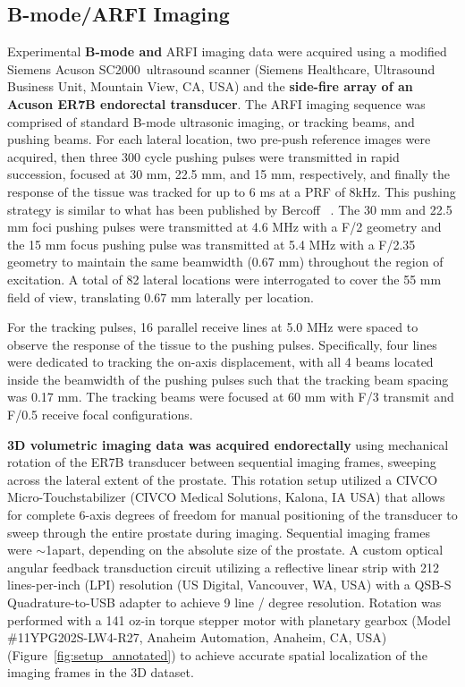 \subsection{B-mode/ARFI Imaging}
Experimental \textbf{B-mode and} ARFI imaging data were acquired using a modified Siemens Acuson
SC2000\texttrademark~ultrasound scanner (Siemens Healthcare, Ultrasound Business Unit,
Mountain View, CA, USA) and the \textbf{side-fire array of an Acuson ER7B
endorectal transducer}.  The ARFI imaging sequence was comprised of
standard B-mode ultrasonic imaging, or tracking beams, and pushing beams. For
each lateral location, two pre-push reference images were acquired, then three
300 cycle pushing pulses were transmitted in rapid succession, focused at 30
mm, 22.5 mm, and 15 mm, respectively, and finally the response of the tissue
was tracked for up to 6 ms at a PRF of 8kHz. This pushing strategy is similar to
what has been published by Bercoff \etal~\cite{Bercoff2004}. The 30 mm and 22.5
mm foci pushing pulses were transmitted at 4.6 MHz with a F/2 geometry and the
15 mm focus pushing pulse was transmitted at 5.4 MHz with a F/2.35 geometry to
maintain the same beamwidth (0.67 mm) throughout the region of excitation. A
total of 82 lateral locations were interrogated to cover the 55 mm field of
view, translating 0.67 mm laterally per location.

For the tracking pulses, 16 parallel receive lines at 5.0 MHz were spaced to
observe the response of the tissue to the pushing pulses.  Specifically, four
lines were dedicated to tracking the on-axis displacement, with all 4 beams
located inside the beamwidth of the pushing pulses such that the tracking beam
spacing was 0.17 mm.  The tracking beams were focused at 60 mm with F/3
transmit and F/0.5 receive focal configurations.

\textbf{3D volumetric imaging data was acquired endorectally} using mechanical
rotation of the ER7B transducer between sequential imaging frames, sweeping
across the lateral extent of the prostate.  This rotation setup utilized a
CIVCO Micro-Touch\texttrademark stabilizer (CIVCO Medical Solutions, Kalona, IA
USA) that allows for complete 6-axis degrees of freedom for manual positioning
of the transducer to sweep through the entire prostate during imaging.
Sequential imaging frames were $\sim$1\degree apart, depending on the absolute
size of the prostate.  A custom optical angular feedback transduction circuit
utilizing a reflective linear strip with 212 lines-per-inch (LPI) resolution
(US Digital, Vancouver, WA, USA) with a QSB-S Quadrature-to-USB adapter to
achieve 9 line / degree resolution.  Rotation was performed with a 141 oz-in
torque stepper motor with planetary gearbox (Model \#11YPG202S-LW4-R27, Anaheim
Automation, Anaheim, CA, USA) (Figure~\ref{fig:setup_annotated}) to achieve
accurate spatial localization of the imaging frames in the 3D dataset.

